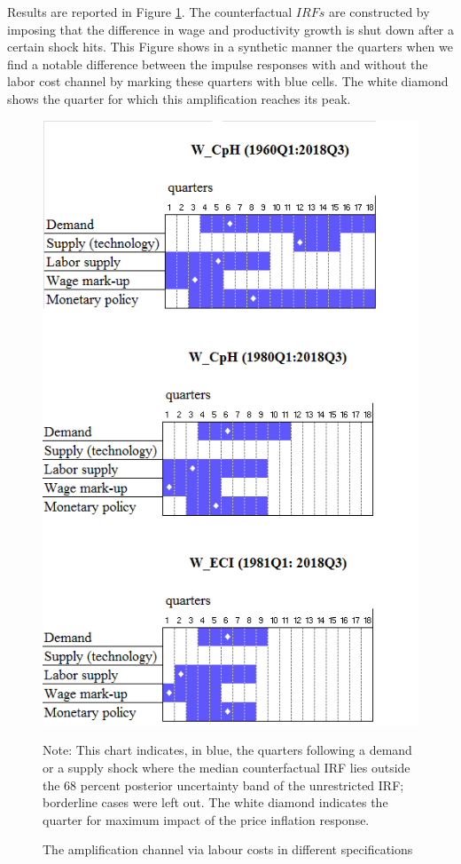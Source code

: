 \documentclass[11pt]{article}
\begin{document}
Results are reported in Figure \ref{fig:Amplif5shock}. The counterfactual $IRFs$ are constructed by imposing that the difference in wage and productivity growth is shut down after a certain shock hits. This Figure shows in a synthetic manner the quarters when we find a notable difference between the impulse responses with and without the labor cost channel by marking these quarters with blue cells. The white diamond shows the quarter for which this amplification reaches its peak.

\begin{figure}[!h]
\begin{center}
\caption{The amplification channel via labour costs in different specifications}\label{fig:Amplif5shock}
\includegraphics[scale = .8]{US_Amplif_5shock.png}
\begin{minipage}{\textwidth} {\footnotesize
Note: This chart indicates, in blue, the quarters following a demand or a supply shock where the median counterfactual IRF lies outside the 68 percent posterior uncertainty band of the unrestricted IRF; borderline cases were left out. The white diamond indicates the quarter for maximum impact of the price inflation response.\par}
\end{minipage}
\end{center}
\end{figure}
\end{document}
